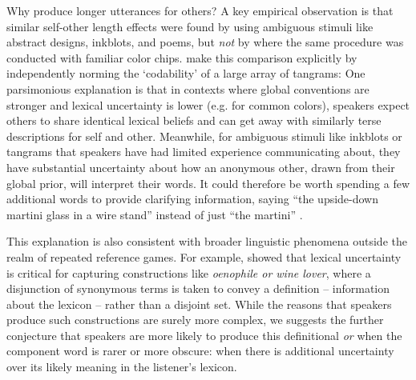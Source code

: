 \documentclass[11pt, floatsintext, jou]{apa6}
\begin{document}
Why produce longer utterances for others? A key empirical observation is that similar self-other length effects were found by  using ambiguous stimuli like abstract designs, inkblots, and poems, but \emph{not} by  where the same procedure was conducted with familiar color chips. \cite{HupetEtAl91_CodabilityReference} make this comparison explicitly by independently norming the `codability' of a large array of tangrams: One parsimonious explanation is that in contexts where global conventions are stronger and lexical uncertainty is lower (e.g. for common colors), speakers expect others to share identical lexical beliefs and can get away with similarly terse descriptions for self and other. Meanwhile, for ambiguous stimuli like inkblots or tangrams that speakers have had limited experience communicating about, they have substantial uncertainty about how an anonymous other, drawn from their global prior, will interpret their words. %
It could therefore be worth spending a few additional words to provide clarifying information, saying ``the upside-down martini glass in a wire stand'' instead of just ``the martini'' .  %


This explanation is also consistent with broader linguistic phenomena outside the realm of repeated reference games. For example,  showed that lexical uncertainty is critical for capturing constructions like \emph{oenophile or wine lover}, where a disjunction of synonymous terms is taken to convey a definition -- information about the lexicon -- rather than a disjoint set. While the reasons that speakers produce such constructions are surely more complex, we suggests the further conjecture that speakers are more likely to produce this definitional \emph{or} when the component word is rarer or more obscure: when there is additional uncertainty over its likely meaning in the listener's lexicon. 
\end{document}
